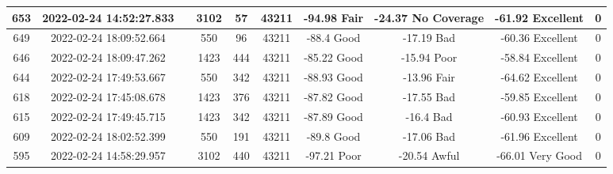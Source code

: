 \begin{longtable*}{|c|c|c|c|c|c|c|c|c|c|}
653&2022-02-24 14:52:27.833&&3102&57&43211& -94.98    Fair        & -24.37    No Coverage & -61.92    Excellent   & 0\\\hline
{}649&2022-02-24 18:09:52.664&&550&96&43211& -88.4     Good        & -17.19    Bad         & -60.36    Excellent   & 0\\\hline
{}646&2022-02-24 18:09:47.262&&1423&444&43211& -85.22    Good        & -15.94    Poor        & -58.84    Excellent   & 0\\\hline
{}644&2022-02-24 17:49:53.667&&550&342&43211& -88.93    Good        & -13.96    Fair        & -64.62    Excellent   & 0\\\hline
{}618&2022-02-24 17:45:08.678&&1423&376&43211& -87.82    Good        & -17.55    Bad         & -59.85    Excellent   & 0\\\hline
{}615&2022-02-24 17:49:45.715&&1423&342&43211& -87.89    Good        & -16.4     Bad         & -60.93    Excellent   & 0\\\hline
{}609&2022-02-24 18:02:52.399&&550&191&43211& -89.8     Good        & -17.06    Bad         & -61.96    Excellent   & 0\\\hline
{}595&2022-02-24 14:58:29.957&&3102&440&43211& -97.21    Poor        & -20.54    Awful       & -66.01    Very Good   & 0\\\hline

\end{longtable*}
